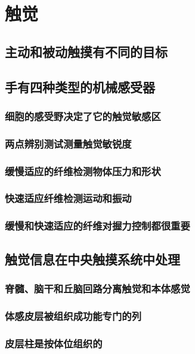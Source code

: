 \chapter{触觉}

\section{主动和被动触摸有不同的目标}

\section{手有四种类型的机械感受器}
\subsection{细胞的感受野决定了它的触觉敏感区}
\subsection{两点辨别测试测量触觉敏锐度}
\subsection{缓慢适应的纤维检测物体压力和形状}
\subsection{快速适应纤维检测运动和振动}
\subsection{缓慢和快速适应的纤维对握力控制都很重要}

\section{触觉信息在中央触摸系统中处理}
\subsection{脊髓、脑干和丘脑回路分离触觉和本体感觉}
\subsection{体感皮层被组织成功能专门的列}
\subsection{皮层柱是按体位组织的}
